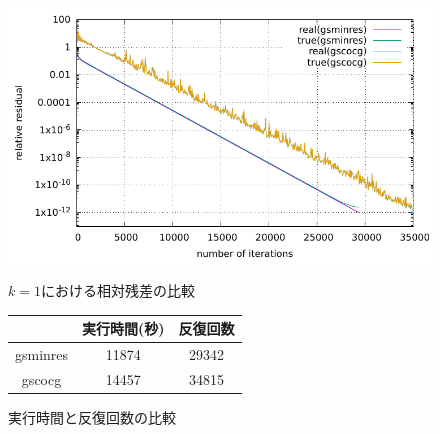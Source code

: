 

\begin{figure}[H]
	\begin{center}
		\begin{minipage}[]{0.49\columnwidth}
			\centering
			\colorbox{white}{ \includegraphics[scale=1.5]{./fig/compare-residual.pdf} }
			\caption{$k=1$における相対残差の比較}
			\label{fig-compare-residual}
		\end{minipage}
		\begin{minipage}[]{0.49\columnwidth}
			\centering
			\makeatletter
			\def\@captype{table}
			\makeatother
			\caption{実行時間と反復回数の比較}
			\label{table-compare-time-itrs}
			\begin{tabular}{ccc}
				\hline
						& 実行時間(秒)	& 反復回数	\\ \hline
				gsminres	& 11874		& 29342	\\
				gscocg	& 14457		& 34815	\\
				\hline
			\end{tabular}
		\end{minipage}
	\end{center}
\end{figure}

